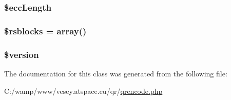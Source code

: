 \hypertarget{class_q_rrawcode_aec29857483c6cbfe18632d3d634bcc0c}{
\subsubsection[{\$ecc\-Length}]{\setlength{\rightskip}{0pt plus 5cm}\$ecc\-Length}}\label{class_q_rrawcode_aec29857483c6cbfe18632d3d634bcc0c}
\hypertarget{class_q_rrawcode_a6216cc954f5667187c4e4f349202a58f}{
\subsubsection[{\$rsblocks}]{\setlength{\rightskip}{0pt plus 5cm}\$rsblocks = array()}}\label{class_q_rrawcode_a6216cc954f5667187c4e4f349202a58f}
\hypertarget{class_q_rrawcode_a17c8948c68aa44fa9961ae169b6a8961}{
\subsubsection[{\$version}]{\setlength{\rightskip}{0pt plus 5cm}\$version}}\label{class_q_rrawcode_a17c8948c68aa44fa9961ae169b6a8961}


The documentation for this class was generated from the following file\-:\begin{DoxyCompactItemize}
\item 
C\-:/wamp/www/vesey.\-atspace.\-eu/qr/\hyperlink{qrencode_8php}{qrencode.\-php}\end{DoxyCompactItemize}
